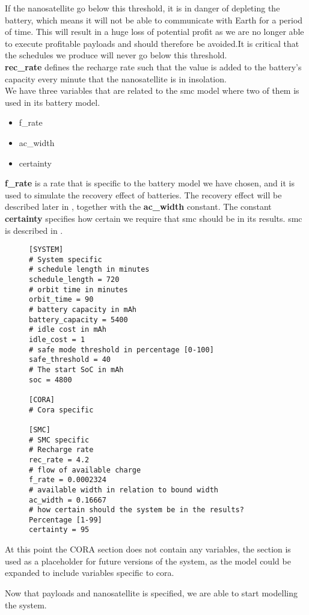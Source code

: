 If the nanosatellite go below this threshold, it is in danger of depleting the battery, which means it will not be able to communicate with Earth for a period of time.
This will result in a huge loss of potential profit as we are no longer able to execute profitable payloads and should therefore be avoided.It is critical that the schedules we produce will never go below this threshold.\\
\textbf{rec\_rate}  defines the recharge rate such that the value is added to the battery's capacity every minute that the nanosatellite is in insolation.\\
We have three variables that are related to the \gls{smc} model where two of them is used in its battery model.\\
\begin{itemize}
	\item f\_rate
	\item ac\_width
	\item certainty
\end{itemize}
\textbf{f\_rate} is a rate that is specific to the battery model we have chosen, and it is used to simulate the recovery effect of batteries. The recovery effect will be described later in , together with the \textbf{ac\_width} constant.
The constant \textbf{certainty} specifies how certain we require that \gls{smc} should be in its results. \gls{smc} is described in .
\begin{figure}[H]
\begin{lstlisting}[caption={Example of how the environment can be defined}, label=lst:ini, language=text]
[SYSTEM]
# System specific
# schedule length in minutes
schedule_length = 720
# orbit time in minutes
orbit_time = 90
# battery capacity in mAh
battery_capacity = 5400
# idle cost in mAh
idle_cost = 1
# safe mode threshold in percentage [0-100]
safe_threshold = 40
# The start SoC in mAh
soc = 4800

[CORA]
# Cora specific

[SMC]
# SMC specific
# Recharge rate
rec_rate = 4.2
# flow of available charge
f_rate = 0.0002324
# available width in relation to bound width
ac_width = 0.16667
# how certain should the system be in the results? Percentage [1-99]
certainty = 95
\end{lstlisting}
\end{figure}
At this point the CORA section does not contain any variables, the section is used as a placeholder for future versions of the system, as the model could be expanded to include variables specific to \gls{cora}.

Now that payloads and nanosatellite is specified, we are able to start modelling the system.
